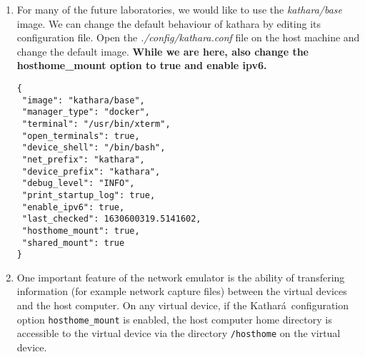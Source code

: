 \documentclass[12pt]{book}
\newcommand{\kathara}{Kathar\'a}
\begin{document}
\begin{enumerate}[{Activity }1)]
  Note: in the CS lab, the \emph{list} command cannot be carried out because of permissions. You are encouraged to install \kathara\ on your own computer and experiment with the list command as well as docker command.

\begin{verbatim}
$ kathara list
TIMESTAMP: 2021-09-04 17:02:43.932187


 LAB HASH                USER      DEVICE NAME  STATUS   CPU %  MEM USAGE / LIMIT   MEM %  NET I/O   

 BquVk2860DTFrej8slHuVg  rbenkocz  pc2          running  0.00%  1.85 MB / 15.31 GB  0.01%  0 B / 0 B 

 BquVk2860DTFrej8slHuVg  rbenkocz  pc3          running  0.00%  1.84 MB / 15.31 GB  0.01%  0 B / 0 B 

 BquVk2860DTFrej8slHuVg  rbenkocz  pc           running  0.00%  3.76 MB / 15.31 GB  0.02%  0 B / 0 B 

\end{verbatim}

\item For many of the future laboratories, we would like to use the \emph{kathara/base} image. We can change the default behaviour of kathara by editing its configuration file. Open the \emph{./config/kathara.conf} file on the host machine and change the default image. \textbf{While we are here, also change the hosthome\_mount option to true and enable ipv6.}
\begin{verbatim}
{
 "image": "kathara/base",
 "manager_type": "docker",
 "terminal": "/usr/bin/xterm",
 "open_terminals": true,
 "device_shell": "/bin/bash",
 "net_prefix": "kathara",
 "device_prefix": "kathara",
 "debug_level": "INFO",
 "print_startup_log": true,
 "enable_ipv6": true,
 "last_checked": 1630600319.5141602,
 "hosthome_mount": true,
 "shared_mount": true
}
\end{verbatim}

\item One important feature of the network emulator is the ability of transfering information (for example network capture files) between the virtual devices and the host computer. On any virtual device, if the \kathara\ configuration option \verb$hosthome_mount$ is enabled, the host computer home directory is accessible to the virtual device via the directory \verb$/hosthome$ on the virtual device.


\end{enumerate}
\end{document}
